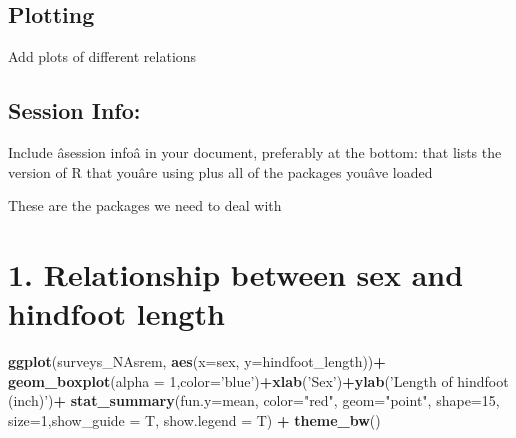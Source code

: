 \documentclass[]{article}
\newenvironment{Shaded}{\begin{snugshade}}{\end{snugshade}}
\newcommand{\KeywordTok}[1]{\textcolor[rgb]{0.13,0.29,0.53}{\textbf{#1}}}
\newcommand{\DataTypeTok}[1]{\textcolor[rgb]{0.13,0.29,0.53}{#1}}
\newcommand{\DecValTok}[1]{\textcolor[rgb]{0.00,0.00,0.81}{#1}}
\newcommand{\StringTok}[1]{\textcolor[rgb]{0.31,0.60,0.02}{#1}}
\newcommand{\OperatorTok}[1]{\textcolor[rgb]{0.81,0.36,0.00}{\textbf{#1}}}
\newcommand{\NormalTok}[1]{#1}
\begin{document}
\subsection{Plotting}\label{plotting}

Add plots of different relations

\subsection{Session Info:}\label{session-info}

Include âsession infoâ in your document, preferably at the bottom:
that lists the version of R that youâre using plus all of the packages
youâve loaded

These are the packages we need to deal with

\section{1. Relationship between sex and hindfoot
length}\label{relationship-between-sex-and-hindfoot-length}

\begin{Shaded}
\begin{Highlighting}[]
\KeywordTok{ggplot}\NormalTok{(surveys_NAsrem, }\KeywordTok{aes}\NormalTok{(}\DataTypeTok{x=}\NormalTok{sex, }\DataTypeTok{y=}\NormalTok{hindfoot_length))}\OperatorTok{+}
\StringTok{  }\KeywordTok{geom_boxplot}\NormalTok{(}\DataTypeTok{alpha =} \DecValTok{1}\NormalTok{,}\DataTypeTok{color=}\StringTok{'blue'}\NormalTok{)}\OperatorTok{+}\KeywordTok{xlab}\NormalTok{(}\StringTok{'Sex'}\NormalTok{)}\OperatorTok{+}\KeywordTok{ylab}\NormalTok{(}\StringTok{'Length of hindfoot (inch)'}\NormalTok{)}\OperatorTok{+}
\StringTok{  }\KeywordTok{stat_summary}\NormalTok{(}\DataTypeTok{fun.y=}\NormalTok{mean, }\DataTypeTok{color=}\StringTok{"red"}\NormalTok{, }\DataTypeTok{geom=}\StringTok{"point"}\NormalTok{, }\DataTypeTok{shape=}\DecValTok{15}\NormalTok{, }\DataTypeTok{size=}\DecValTok{1}\NormalTok{,}\DataTypeTok{show_guide =}\NormalTok{ T, }\DataTypeTok{show.legend =}\NormalTok{ T) }\OperatorTok{+}\StringTok{ }\KeywordTok{theme_bw}\NormalTok{()}
\end{Highlighting}
\end{Shaded}
\end{document}

